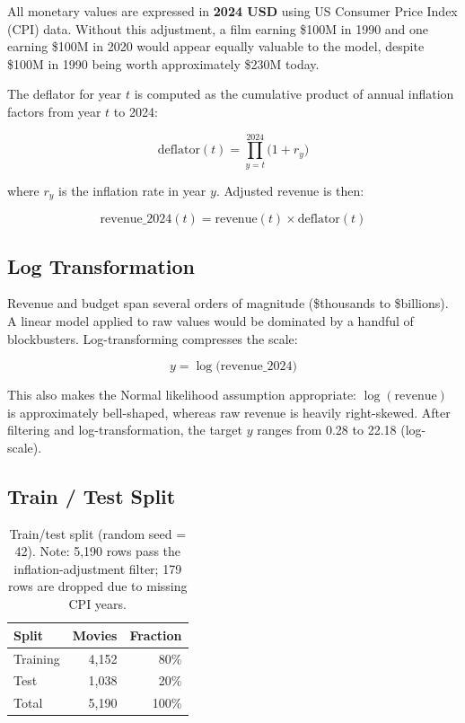 \documentclass[12pt,a4paper]{article}
\begin{document}
All monetary values are expressed in \textbf{2024 USD} using US Consumer
Price Index (CPI) data. Without this adjustment, a film earning \$100M in
1990 and one earning \$100M in 2020 would appear equally valuable to the
model, despite \$100M in 1990 being worth approximately \$230M today.

The deflator for year $t$ is computed as the cumulative product of annual
inflation factors from year $t$ to 2024:

\begin{equation}
  \text{deflator}(t) = \prod_{y=t}^{2024} \bigl(1 + r_y\bigr)
\end{equation}

where $r_y$ is the inflation rate in year $y$. Adjusted revenue is then:

\begin{equation}
  \text{revenue\_2024}(t) = \text{revenue}(t) \times \text{deflator}(t)
\end{equation}

\subsection{Log Transformation}

Revenue and budget span several orders of magnitude (\$thousands to
\$billions). A linear model applied to raw values would be dominated by
a handful of blockbusters. Log-transforming compresses the scale:

\begin{equation}
  y = \log\bigl(\text{revenue\_2024}\bigr)
\end{equation}

This also makes the Normal likelihood assumption appropriate:
$\log(\text{revenue})$ is approximately bell-shaped, whereas raw revenue
is heavily right-skewed. After filtering and log-transformation, the
target $y$ ranges from 0.28 to 22.18 (log-scale).

\subsection{Train / Test Split}

\begin{table}[H]
\centering
\begin{tabular}{lrr}
\toprule
\textbf{Split} & \textbf{Movies} & \textbf{Fraction} \\
\midrule
Training & 4,152 & 80\% \\
Test     & 1,038 & 20\% \\
\midrule
Total    & 5,190 & 100\% \\
\bottomrule
\end{tabular}
\caption{Train/test split (random seed = 42). Note: 5,190 rows pass the
inflation-adjustment filter; 179 rows are dropped due to missing CPI years.}
\end{table}
\end{document}

